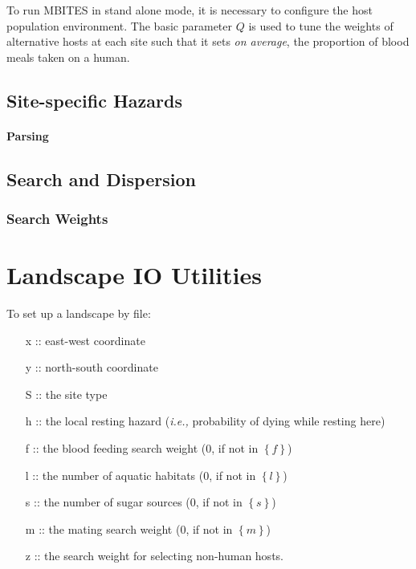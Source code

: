 \documentclass{article}
\newcommand{\ie}{{\em i.e., }}
\begin{document}
To run MBITES in stand alone mode, it is necessary to configure the host population environment.  The basic parameter $Q$ is used to tune the weights of alternative hosts at each site such that it sets {\em on average}, the proportion of blood meals taken on a human.

\subsection{Site-specific Hazards}

\paragraph{Parsing}


\subsection{Search and Dispersion}

\subsubsection{Search Weights}

\section{Landscape IO Utilities}

To set up a landscape by file:  
\begin{itemize}
\item [x] :: east-west coordinate
\item [y] :: north-south coordinate
\item [S] :: the site type
\item [h] :: the local resting hazard (\ie probability of dying while resting here)
\item [f] :: the blood feeding search weight (0, if not in $\left\{f\right\}$)
\item [l] :: the number of aquatic habitats (0, if not in $\left\{l\right\}$)
\item [s] :: the number of sugar sources (0, if not in $\left\{s\right\}$)
\item [m] :: the mating search weight (0, if not in $\left\{m\right\}$)
\item [z] :: the search weight for selecting non-human hosts. 
\end{itemize}
\end{document}
